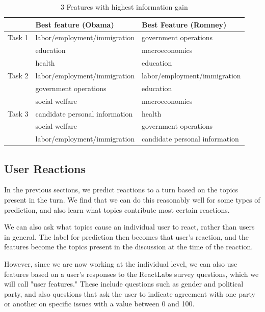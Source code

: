 \begin{table}[H]
\begin{centering}
\begin{tabular}{| l | l | l |}
\hline
  & Best feature (Obama) & Best Feature (Romney) \\
\hline
Task 1 & labor/employment/immigration & government operations \\
	    & education & macroeconomics \\
	    & health & education \\
	    \hline
Task 2 & labor/employment/immigration & labor/employment/immigration \\
	    & government operations & education \\
	    & social welfare & macroeconomics  \\
	    \hline
Task 3 & candidate personal information & health \\
	    & social welfare & government operations \\
	    & labor/employment/immigration & candidate personal information \\
	    \hline
\end{tabular}
\caption{3 Features with highest information gain}
\end{centering}
\end{table}


\subsection{User Reactions}

In the previous sections, we predict reactions to a turn based on the topics present in the turn. We find that we can do this reasonably well for some types of prediction, and also learn what topics contribute most certain reactions.

We can also ask what topics cause an individual user to react, rather than users in general. The label for prediction then becomes that user's reaction, and the features become the topics present in the discussion at the time of the reaction.

However, since we are now working at the individual level, we can also use features based on a user's responses to the ReactLabs survey questions, which we will call "user features." These include questions such as gender and political party, and also questions that ask the user to indicate agreement with one party or another on specific issues with a value between 0 and 100.

